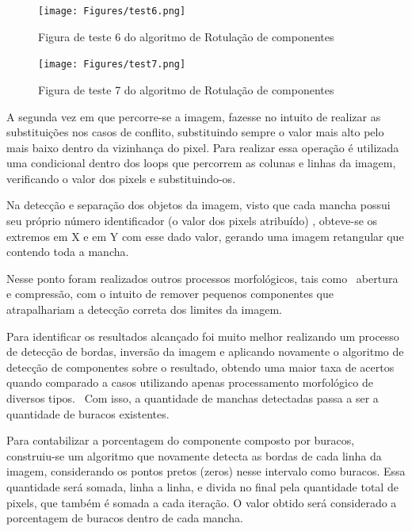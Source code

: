 \documentclass{article}
\begin{document}
\begin{figure}[H]
	\label{fig: test6}
	\begin{minipage}[b]{1.0\linewidth}
		\centering
		\centerline{\texttt{[image: Figures/test6.png]}}
		\vspace{-2.0cm}
		\centerline{Figura de teste 6 do algoritmo de Rotulação de componentes}\medskip	
	\end{minipage}
\end{figure}

\begin{figure}[H]
	\label{fig: test7}
	\begin{minipage}[b]{1.0\linewidth}
		\centering
		\centerline{\texttt{[image: Figures/test7.png]}}
		\vspace{-2.0cm}
		\centerline{Figura de teste 7 do algoritmo de Rotulação de componentes}\medskip	
	\end{minipage}
\end{figure}

A segunda vez em que percorre-se a imagem, fazesse no intuito de realizar as substituições nos casos de conflito, substituindo sempre o valor mais alto pelo mais baixo dentro da vizinhança do pixel. Para realizar essa operação é utilizada uma condicional dentro dos loops que percorrem as colunas e linhas da imagem, verificando o valor dos pixels e substituindo-os. 

Na detecção e separação dos objetos da imagem, visto que cada mancha possui seu próprio número identificador (o valor dos pixels atribuído) , obteve-se os extremos em X e em Y com esse dado valor, gerando uma imagem retangular que contendo toda a mancha. 

Nesse ponto foram realizados outros processos morfológicos, tais como  abertura e compressão, com o intuito de remover pequenos componentes que atrapalhariam a detecção correta dos limites da imagem. 

Para identificar os resultados alcançado foi muito melhor realizando um processo de detecção de bordas, inversão da imagem e aplicando novamente o algoritmo de detecção de componentes sobre o resultado, obtendo uma maior taxa de acertos quando comparado a casos utilizando apenas processamento morfológico de diversos tipos.  Com isso, a quantidade de manchas detectadas passa a ser a quantidade de buracos existentes. 

Para contabilizar a porcentagem do componente composto por buracos, construiu-se um algoritmo que novamente detecta as bordas de cada linha da imagem, considerando os pontos pretos (zeros) nesse intervalo como buracos. Essa quantidade será somada, linha a linha, e divida no final pela quantidade total de pixels, que também é somada a cada iteração. O valor obtido será considerado a porcentagem de buracos dentro de cada mancha.
\end{document}
